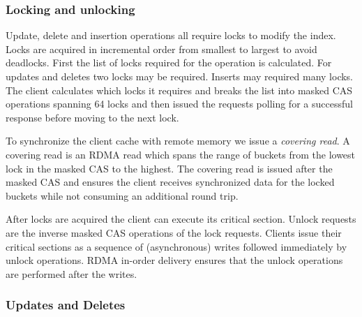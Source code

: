 \subsubsection{Locking and unlocking}

Update, delete and insertion operations all require locks to
modify the index. Locks are acquired in incremental order
from smallest to largest to avoid deadlocks. First the list
of locks required for the operation is calculated. For
updates and deletes two locks may be required. Inserts may
required many locks. The client calculates which locks it
requires and breaks the list into masked CAS operations
spanning 64 locks and then issued the requests polling for a
successful response before moving to the next lock.

To synchronize the client cache with remote memory we issue
a \textit{covering read}. A covering read is an RDMA read
which spans the range of buckets from the lowest lock in the
masked CAS to the highest. The covering read is issued after
the masked CAS and ensures the client receives synchronized
data for the locked buckets while not consuming an
additional round trip.


After locks are acquired the client can execute its critical
section. Unlock requests are the inverse masked CAS operations of the
lock requests. Clients issue their critical sections as a sequence of
(asynchronous) writes followed immediately by unlock operations. RDMA
in-order delivery ensures that the unlock operations are performed
after the writes.

\subsubsection{Updates and Deletes}

